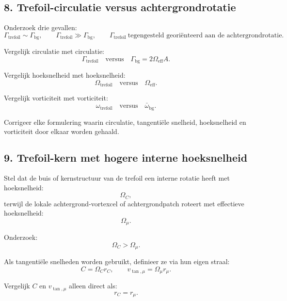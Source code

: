 \documentclass[11pt]{article}
\begin{document}
    \subsection{8. Trefoil-circulatie versus achtergrondrotatie}
        
        Onderzoek drie gevallen:
        \[
            \Gamma_{\mathrm{trefoil}}\sim\Gamma_{\mathrm{bg}},
            \qquad
            \Gamma_{\mathrm{trefoil}}\gg\Gamma_{\mathrm{bg}},
            \qquad
            \Gamma_{\mathrm{trefoil}}\ \text{tegengesteld georiënteerd aan de achtergrondrotatie}.
        \]
        
        Vergelijk circulatie met circulatie:
        \[
            \Gamma_{\mathrm{trefoil}}
            \quad\text{versus}\quad
            \Gamma_{\mathrm{bg}}=2\Omega_{\mathrm{eff}}A.
        \]
        
        Vergelijk hoeksnelheid met hoeksnelheid:
        \[
            \Omega_{\mathrm{trefoil}}
            \quad\text{versus}\quad
            \Omega_{\mathrm{eff}}.
        \]
        
        Vergelijk vorticiteit met vorticiteit:
        \[
            \omega_{\mathrm{trefoil}}
            \quad\text{versus}\quad
            \bar{\omega}_{\mathrm{bg}}.
        \]
        
        Corrigeer elke formulering waarin circulatie, tangentiële snelheid, hoeksnelheid en vorticiteit door elkaar worden gehaald.
    
    \subsection{9. Trefoil-kern met hogere interne hoeksnelheid}
        
        Stel dat de buis of kernstructuur van de trefoil een interne rotatie heeft met hoeksnelheid:
        \[
            \Omega_C,
        \]
        terwijl de lokale achtergrond-vortexcel of achtergrondpatch roteert met effectieve hoeksnelheid:
        \[
            \Omega_{\mu}.
        \]
        
        Onderzoek:
        \[
            \Omega_C>\Omega_{\mu}.
        \]
        
        Als tangentiële snelheden worden gebruikt, definieer ze via hun eigen straal:
        \[
            C=\Omega_C r_C,
            \qquad
            v_{\tan,\mu}=\Omega_{\mu}r_{\mu}.
        \]
        
        Vergelijk \(C\) en \(v_{\tan,\mu}\) alleen direct als:
        \[
            r_C=r_{\mu}.
        \]
        
\end{document}
